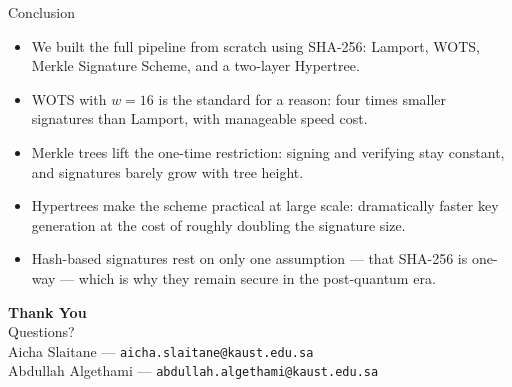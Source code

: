 \documentclass[aspectratio=169, 10pt]{beamer}
\begin{document}
\begin{frame}{Conclusion}
\begin{itemize}
    \item We built the full pipeline from scratch using SHA-256: Lamport, WOTS, Merkle Signature Scheme, and a two-layer Hypertree.
    \item WOTS with $w = 16$ is the standard for a reason: four times smaller signatures than Lamport, with manageable speed cost.
    \item Merkle trees lift the one-time restriction: signing and verifying stay constant, and signatures barely grow with tree height.
    \item Hypertrees make the scheme practical at large scale: dramatically faster key generation at the cost of roughly doubling the signature size.
    \item Hash-based signatures rest on only one assumption --- that SHA-256 is one-way --- which is why they remain secure in the post-quantum era.
\end{itemize}
\end{frame}

\begin{frame}{}
\centering
\vspace{2cm}
{\Huge\bfseries Thank You}\\[16pt]
{\Large Questions?}\\[20pt]
\footnotesize
Aicha Slaitane --- \texttt{aicha.slaitane@kaust.edu.sa}\\
Abdullah Algethami --- \texttt{abdullah.algethami@kaust.edu.sa}
\end{frame}
\end{document}
